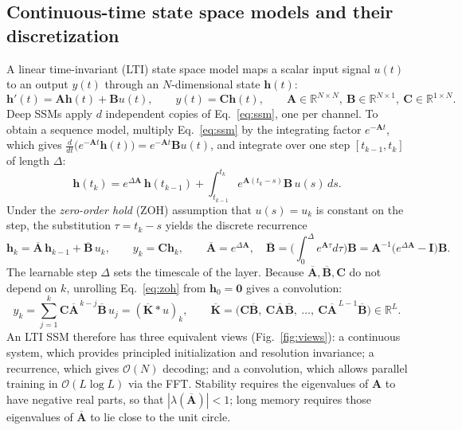 \documentclass[a4paper]{article}
\newcommand{\R}{\mathbb{R}}
\newcommand{\vh}{\mathbf{h}}
\newcommand{\mA}{\mathbf{A}}
\newcommand{\mB}{\mathbf{B}}
\newcommand{\mC}{\mathbf{C}}
\newcommand{\mI}{\mathbf{I}}
\newcommand{\Ab}{\overline{\mathbf{A}}}
\newcommand{\Bb}{\overline{\mathbf{B}}}
\newcommand{\Kb}{\overline{\mathbf{K}}}
\newcommand{\bigO}{\mathcal{O}}
\theoremstyle{plain}
\theoremstyle{remark}
\begin{document}
\subsection{Continuous-time state space models and their discretization}
A linear time-invariant (LTI) state space model maps a scalar input signal $u(t)$ to an output $y(t)$ through an $N$-dimensional state $\vh(t)$:
\begin{equation}
\label{eq:ssm}
\vh'(t)=\mA\vh(t)+\mB u(t),\qquad y(t)=\mC\vh(t),\qquad \mA\in\R^{N\times N},\ \mB\in\R^{N\times 1},\ \mC\in\R^{1\times N}.
\end{equation}
Deep SSMs apply $d$ independent copies of Eq.~\eqref{eq:ssm}, one per channel. To obtain a sequence model, multiply Eq.~\eqref{eq:ssm} by the integrating factor $e^{-\mA t}$, which gives $\frac{d}{dt}\big(e^{-\mA t}\vh(t)\big)=e^{-\mA t}\mB u(t)$, and integrate over one step $[t_{k-1},t_k]$ of length $\Delta$:
\begin{equation}
\label{eq:exact}
\vh(t_k)=e^{\Delta\mA}\,\vh(t_{k-1})+\int_{t_{k-1}}^{t_k}e^{\mA(t_k-s)}\mB\,u(s)\,ds .
\end{equation}
Under the \emph{zero-order hold} (ZOH) assumption that $u(s)=u_k$ is constant on the step, the substitution $\tau=t_k-s$ yields the discrete recurrence
\begin{equation}
\label{eq:zoh}
\vh_k=\Ab\,\vh_{k-1}+\Bb\,u_k,\qquad y_k=\mC\vh_k,\qquad
\Ab=e^{\Delta\mA},\quad \Bb=\Big(\int_0^{\Delta}e^{\mA\tau}d\tau\Big)\mB=\mA^{-1}\big(e^{\Delta\mA}-\mI\big)\mB .
\end{equation}
The learnable step $\Delta$ sets the timescale of the layer. Because $\Ab,\Bb,\mC$ do not depend on $k$, unrolling Eq.~\eqref{eq:zoh} from $\vh_0=\mathbf{0}$ gives a convolution:
\begin{equation}
\label{eq:conv}
y_k=\sum_{j=1}^{k}\mC\Ab^{\,k-j}\Bb\,u_j=(\Kb*u)_k,\qquad \Kb=\big(\mC\Bb,\ \mC\Ab\Bb,\ \dots,\ \mC\Ab^{\,L-1}\Bb\big)\in\R^{L}.
\end{equation}
An LTI SSM therefore has three equivalent views (Fig.~\ref{fig:views}): a continuous system, which provides principled initialization and resolution invariance; a recurrence, which gives $\bigO(N)$ decoding; and a convolution, which allows parallel training in $\bigO(L\log L)$ via the FFT. Stability requires the eigenvalues of $\mA$ to have negative real parts, so that $|\lambda(\Ab)|<1$; long memory requires those eigenvalues of $\Ab$ to lie close to the unit circle.
\end{document}
